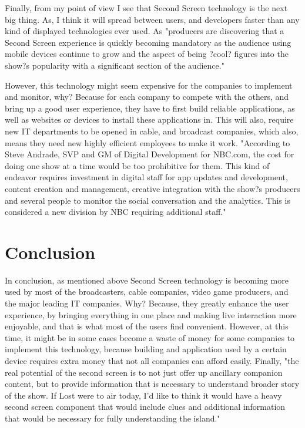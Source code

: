 \documentclass[12pt, oneside]{amsart}   	%
\begin{document}
Finally, from my point of view I see that Second Screen technology is the next big thing.  As, I think it will spread between users, and developers faster than any kind of displayed technologies ever used. As "producers are discovering that a Second Screen experience is quickly becoming mandatory as the audience using mobile devices continue to grow and the aspect of being ?cool? figures into the show?s popularity with a significant section of the audience."\cite{Second-Screen-Art}

 However, this technology might seem expensive for the companies to implement and monitor, why?  Because for each company to compete with the others, and bring up a good user experience, they have to first build reliable applications, as well as websites or devices to install these applications in.  This will also, require new IT departments to be opened in cable, and broadcast companies, which also, means they need new highly efficient employees to make it work.  "According to Steve Andrade, SVP and GM of Digital Development for NBC.com, the cost for doing one show at a time would be too prohibitive for them. This kind of endeavor requires investment in digital staff for app updates and development, content creation and management, creative integration with the show?s producers and several people to monitor the social conversation and the analytics. This is considered a new division by NBC requiring additional staff." \cite{Second-Screen-Art}

 \section{Conclusion}

In conclusion, as mentioned above Second Screen technology is becoming more used by most of the broadcasters, cable companies, video game producers, and the major leading IT companies.  Why? Because, they greatly enhance the user experience, by bringing everything in one place and making live interaction more enjoyable, and that is what most of the users find convenient. However, at this time, it might be in some cases become a waste of money for some companies to implement this technology, because building and application used by a certain device requires extra money that not all companies can afford easily.  Finally, "the real potential of the second screen is to not just offer up ancillary companion content, but to provide information that is necessary to understand broader story of the show. If Lost were to air today, I'd like to think it would have a heavy second screen component that would include clues and additional information that would be necessary for fully understanding the island."\cite{Second-Screen-His}
 
 

 
 
\end{document}
